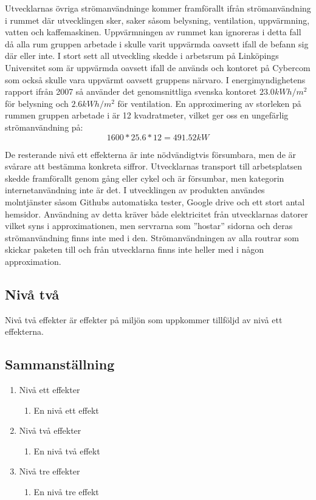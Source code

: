 Utvecklarnas övriga strömanvändninge kommer framförallt ifrån strömanvändning i rummet där utvecklingen sker, saker såsom belysning, ventilation, uppvärmning, vatten och kaffemaskinen. Uppvärmningen av rummet kan ignoreras i detta fall då alla rum gruppen arbetade i skulle varit uppvärmda oavsett ifall de befann sig där eller inte. I stort sett all utveckling skedde i arbetsrum på Linköpings Universitet som är uppvärmda oavsett ifall de används och kontoret på Cybercom som också skulle vara uppvärmt oavsett gruppens närvaro. I energimyndighetens rapport ifrån 2007\cite{emynd} så använder det genomsnittliga svenska kontoret $23.0kWh/m^2$ för belysning och $2.6kWh/m^2$ för ventilation. En approximering av storleken på rummen gruppen arbetade i är 12 kvadratmeter, vilket ger oss en ungefärlig strömanvändning på: $$1600 * 25.6 * 12 = 491.52kW$$

De resterande nivå ett effekterna är inte nödvändigtvis försumbara, men de är svårare att bestämma konkreta siffror. Utvecklarnas transport till arbetsplatsen skedde framförallt genom gång eller cykel och är försumbar, men kategorin internetanvändning inte är det. I utvecklingen av produkten användes molntjänster såsom Githubs automatiska tester, Google drive och ett stort antal hemsidor. Användning av detta kräver både elektricitet från utvecklarnas datorer vilket syns i approximationen, men servrarna som ''hostar'' sidorna och deras strömanvändning  finns inte med i den. Strömanvändningen av alla routrar som skickar paketen till och från utvecklarna finns inte heller med i någon approximation.

\subsection{Nivå två}
Nivå två effekter är effekter på miljön som uppkommer tillföljd av nivå ett effekterna. 

\subsection{Sammanställning}
\begin{enumerate}
	\item Nivå ett effekter
	\begin{enumerate}
		\item En nivå ett effekt
	\end{enumerate}
	\item Nivå två effekter
	\begin{enumerate}
		\item En nivå två effekt
	\end{enumerate}
	\item Nivå tre effekter
	\begin{enumerate}
		\item En nivå tre effekt
	\end{enumerate}
\end{enumerate}